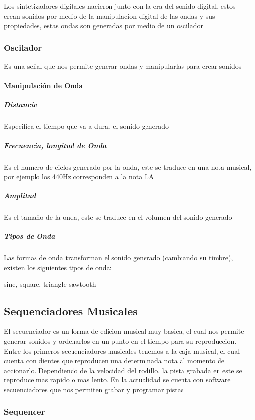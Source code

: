 Los sintetizadores digitales nacieron junto con la era del sonido digital,
estos crean sonidos por medio de la manipulacion digital de las ondas
y sus propiedades, estas ondas son generadas por medio de un oscilador

\subsubsection{Oscilador}

Es una señal que nos permite generar ondas y manipularlas para crear
sonidos

\paragraph{Manipulación de Onda}
\subparagraph{Distancia}

Especifica el tiempo que va a durar el sonido generado

\subparagraph{Frecuencia, longitud de Onda}

Es el numero de ciclos generado por la onda, este se traduce en una
nota musical, por ejemplo los 440Hz corresponden a la nota LA

\subparagraph{Amplitud}

Es el tamaño de la onda, este se traduce en el volumen del
sonido generado

\subparagraph{Tipos de Onda}

Las formas de onda transforman el sonido generado (cambiando su timbre),
existen los siguientes tipos de onda:

sine, square, triangle sawtooth

\subsection{Sequenciadores Musicales}

El secuenciador es un forma de edicion musical muy basica, el cual
nos permite generar sonidos y ordenarlos en un punto en el tiempo
para su reproduccion. Entre los primeros secuenciadores musicales
tenemos a la caja musical, el cual cuenta con dientes que reproducen
una determinada nota al momento de accionarlo. Dependiendo
de la velocidad del rodillo, la pista grabada en este se reproduce
mas rapido o mas lento. En la actualidad se cuenta con software
secuenciadores que nos permiten grabar y programar pistas

\subsubsection{Sequencer}

